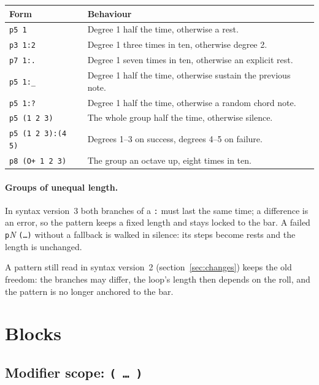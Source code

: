 \documentclass[11pt,a4paper]{article}
\newcommand{\pat}[1]{\texttt{#1}}
\newcommand{\meta}[1]{\textit{#1}}
\begin{document}
\begin{center}
\begin{tabular}{@{}lp{85mm}@{}}
\toprule
\textbf{Form} & \textbf{Behaviour}\\
\midrule
\pat{p5 1}            & Degree 1 half the time, otherwise a rest.\\
\pat{p3 1:2}          & Degree 1 three times in ten, otherwise degree 2.\\
\pat{p7 1:.}          & Degree 1 seven times in ten, otherwise an explicit rest.\\
\pat{p5 1:\_}         & Degree 1 half the time, otherwise sustain the previous note.\\
\pat{p5 1:?}          & Degree 1 half the time, otherwise a random chord note.\\
\midrule
\pat{p5 (1 2 3)}      & The whole group half the time, otherwise silence.\\
\pat{p5 (1 2 3):(4 5)}& Degrees 1--3 on success, degrees 4--5 on failure.\\
\pat{p8 (O+ 1 2 3)}   & The group an octave up, eight times in ten.\\
\bottomrule
\end{tabular}
\end{center}

\paragraph{Groups of unequal length.} In syntax version~3 both branches of a
\pat{:} must last the same time; a difference is an error, so the pattern
keeps a fixed length and stays locked to the bar. A failed
\pat{p}\meta{N} \pat{(\ldots)} without a fallback is walked in silence: its
steps become rests and the length is unchanged.

A pattern still read in syntax version~2 (section~\ref{sec:changes}) keeps the
old freedom: the branches may differ, the loop's length then depends on the
roll, and the pattern is no longer anchored to the bar.

\section{Blocks}
\label{sec:blocks}

\subsection{Modifier scope: \texttt{( \ldots\ )}}
\end{document}
